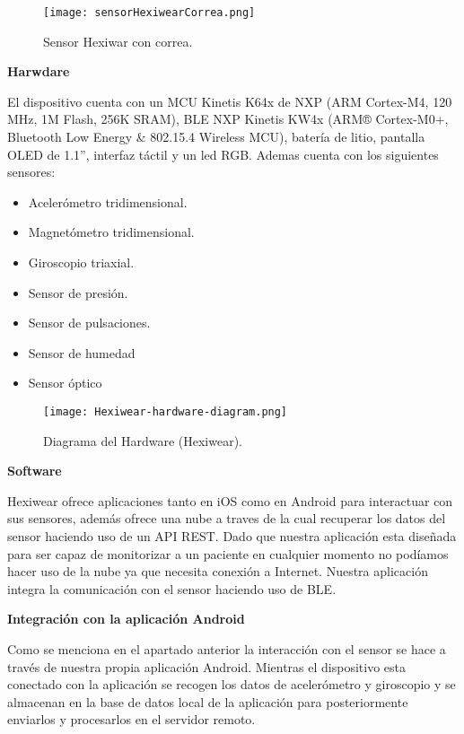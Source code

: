 \begin{figure}[h!]
  \centering
  \texttt{[image: sensorHexiwearCorrea.png]}
  \caption{Sensor Hexiwar con correa.}
\end{figure}
\newpage

{\bf Harwdare}
\newline

El dispositivo cuenta con un MCU Kinetis K64x de NXP (ARM Cortex-M4, 120 MHz, 1M Flash, 256K SRAM), BLE NXP Kinetis KW4x (ARM® Cortex-M0+, Bluetooth Low Energy \& 802.15.4 Wireless MCU), batería de litio, pantalla OLED
de 1.1'', interfaz táctil y un led RGB. Ademas cuenta con los siguientes sensores:

\begin{itemize}
  \item Acelerómetro tridimensional.
  \item Magnetómetro tridimensional.
  \item Giroscopio triaxial.
  \item Sensor de presión.
  \item Sensor de pulsaciones.
  \item Sensor de humedad
  \item Sensor óptico
\end{itemize}

\begin{figure}[H]
  \centering
  \texttt{[image: Hexiwear-hardware-diagram.png]}
  \caption{Diagrama del Hardware (Hexiwear).}
\end{figure}

{\bf Software}
\newline

Hexiwear ofrece aplicaciones tanto en iOS como en Android para interactuar con sus sensores, además ofrece una nube a traves de la cual recuperar los datos del sensor haciendo uso de un API REST. Dado que nuestra aplicación esta diseñada para ser capaz de monitorizar a un paciente en cualquier momento no podíamos hacer uso de la nube ya que necesita conexión a Internet. Nuestra aplicación integra la comunicación con el sensor haciendo uso de BLE.
\newline

{\bf Integración con la aplicación Android}
\newline

Como se menciona en el apartado anterior la interacción con el sensor se hace a través de nuestra propia aplicación Android. Mientras el dispositivo esta conectado con la aplicación se recogen los datos de acelerómetro y giroscopio y se almacenan en la base de datos local de la aplicación para posteriormente enviarlos y procesarlos en el servidor remoto.
\newpage

